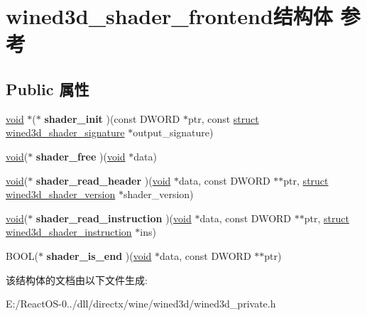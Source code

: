 \hypertarget{structwined3d__shader__frontend}{}\section{wined3d\+\_\+shader\+\_\+frontend结构体 参考}
\label{structwined3d__shader__frontend}
\subsection*{Public 属性}
\begin{DoxyCompactItemize}
\item 
\mbox{\label{structwined3d__shader__frontend_a1bc927550e926220aaab73133175d87d}} 
\hyperlink{interfacevoid}{void} $\ast$($\ast$ {\bfseries shader\+\_\+init} )(const D\+W\+O\+RD $\ast$ptr, const \hyperlink{interfacestruct}{struct} \hyperlink{structwined3d__shader__signature}{wined3d\+\_\+shader\+\_\+signature} $\ast$output\+\_\+signature)
\item 
\mbox{\label{structwined3d__shader__frontend_a88f1d4418558e9e96d6947b4c9e1476f}} 
\hyperlink{interfacevoid}{void}($\ast$ {\bfseries shader\+\_\+free} )(\hyperlink{interfacevoid}{void} $\ast$data)
\item 
\mbox{\label{structwined3d__shader__frontend_a219b1a4c5864b2a1ae2820ddda5a311e}} 
\hyperlink{interfacevoid}{void}($\ast$ {\bfseries shader\+\_\+read\+\_\+header} )(\hyperlink{interfacevoid}{void} $\ast$data, const D\+W\+O\+RD $\ast$$\ast$ptr, \hyperlink{interfacestruct}{struct} \hyperlink{structwined3d__shader__version}{wined3d\+\_\+shader\+\_\+version} $\ast$shader\+\_\+version)
\item 
\mbox{\label{structwined3d__shader__frontend_acd7fb202b35de4455de4d7cb4cc838dd}} 
\hyperlink{interfacevoid}{void}($\ast$ {\bfseries shader\+\_\+read\+\_\+instruction} )(\hyperlink{interfacevoid}{void} $\ast$data, const D\+W\+O\+RD $\ast$$\ast$ptr, \hyperlink{interfacestruct}{struct} \hyperlink{structwined3d__shader__instruction}{wined3d\+\_\+shader\+\_\+instruction} $\ast$ins)
\item 
\mbox{\label{structwined3d__shader__frontend_a43adef557601fb2b06f18b9e65a2cfd4}} 
B\+O\+OL($\ast$ {\bfseries shader\+\_\+is\+\_\+end} )(\hyperlink{interfacevoid}{void} $\ast$data, const D\+W\+O\+RD $\ast$$\ast$ptr)
\end{DoxyCompactItemize}


该结构体的文档由以下文件生成\+:\begin{DoxyCompactItemize}
\item 
E\+:/\+React\+O\+S-\/0../dll/directx/wine/wined3d/wined3d\+\_\+private.\+h\end{DoxyCompactItemize}
